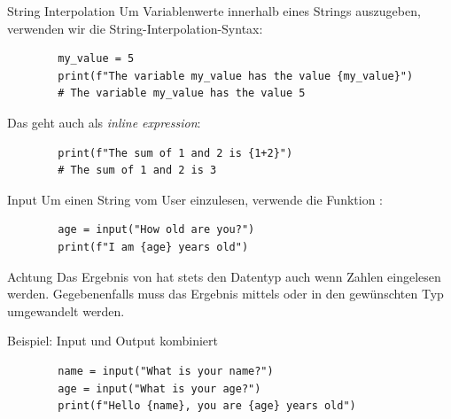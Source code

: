 \begin{fragile}[]
	
	\begin{block}{String Interpolation}
		\vspace{2pt}
		Um Variablenwerte innerhalb eines Strings auszugeben, verwenden wir die String-Interpolation-Syntax:
		\begin{verbatim}
		my_value = 5
		print(f"The variable my_value has the value {my_value}")
		# The variable my_value has the value 5
		\end{verbatim}
		
		\pause
		
		\vspace{12pt}
		
		Das geht auch als \textit{inline expression}: 
		\begin{verbatim}
		print(f"The sum of 1 and 2 is {1+2}")
		# The sum of 1 and 2 is 3
		\end{verbatim}
		
	\end{block}
	
\end{fragile}

\begin{fragile}
	\begin{block}{Input}
		\vspace{2pt}
		Um einen String vom User einzulesen, verwende die Funktion :
		
		\begin{verbatim}
		age = input("How old are you?")
		print(f"I am {age} years old")
		\end{verbatim}
	\end{block}
	\pause 
	\begin{alertblock}{Achtung}
		\vspace{2pt}
		Das Ergebnis von  hat stets den Datentyp  auch wenn Zahlen eingelesen werden. Gegebenenfalls muss das Ergebnis mittels  oder  in den gewünschten Typ umgewandelt werden. 	
	\end{alertblock}
	
\end{fragile}


\begin{fragile}[]
	\begin{exampleblock}{Beispiel: Input und Output kombiniert}
		\begin{verbatim}
		name = input("What is your name?")
		age = input("What is your age?")
		print(f"Hello {name}, you are {age} years old") 
		\end{verbatim}
	\end{exampleblock}
\end{fragile}

